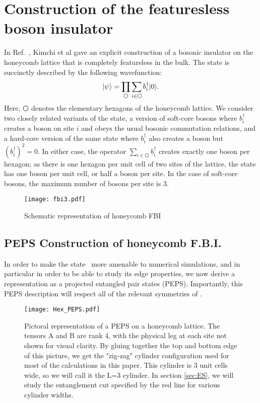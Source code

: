 
\section{Construction of the featuresless boson insulator}

In Ref.~, Kimchi et al gave an explicit construction of a bosonic insulator
on the honeycomb lattice that is completely featureless in the bulk. The state is succinctly described by the following
wavefunction:
\begin{equation} \label{eq:def}
\ket{\psi} = \prod\limits_{\varhexagon} \sum\limits_{i \in \varhexagon} b^{\dagger}_{i} \ket{0}.
\end{equation}
Here, $\varhexagon$ denotes the elementary hexagons of the honeycomb lattice. We consider two closely related
variants of the state, a version of soft-core bosons where $b_i^\dagger$ creates a boson on site $i$ and obeys the
usual bosonic commutation relations, and a hard-core version of the same state where $b_i^\dagger$ also creates a
boson but $(b_i^\dagger)^2=0$.
In either case, the operator $\sum_{i \in \varhexagon} b^{\dagger}_{i}$ creates exactly one boson per hexagon;
as there is one hexagon per unit cell of two sites of the lattice, the state has one boson per unit cell, or half a boson per site.
In the case of soft-core bosons, the maximum number of bosons per site is 3.

\begin{figure}[H]
	\centering
	\texttt{[image: fbi3.pdf]}
	\caption{Schematic representation of honeycomb FBI}
\end{figure}

\subsection{PEPS Construction of honeycomb F.B.I.}

In order to make the state~ more amenable to numerical simulations, and in particular in order to be able to study its
edge properties, we now derive a representation as a projected entangled pair states (PEPS). 
Importantly, this PEPS description will respect all of the relevant symmetries of .

\begin{figure}[H]
	\centering
	\texttt{[image: Hex\_PEPS.pdf]}
	\caption{ Pictoral representation of a PEPS on a honeycomb lattice. The tensors A and B are rank 4, with the physical leg at each site not shown for visual clarity. By gluing together the top and bottom edge of this picture, we get the "zig-zag" cylinder configuration used for most of the calculations in this paper. This cylinder is 3 unit cells wide, so we will call it the L=3 cylinder. In section \ref{sec:ES}, we will study the entanglement cut specified by the red line for various cylinder widths.}
	\label{fig:PEPS}
\end{figure}

